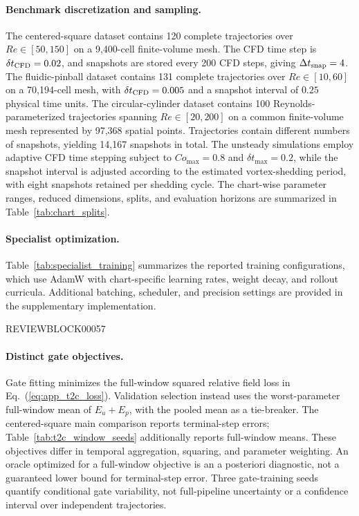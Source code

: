 \documentclass{article}
\def\plaineqref#1{\ref{#1}}
\begin{document}
\paragraph{Benchmark discretization and sampling.}
The centered-square dataset contains 120 complete trajectories over
$Re\in[50,150]$ on a 9,400-cell finite-volume mesh. The CFD time step is $\delta t_{\rm CFD}=0.02$, and snapshots are stored every 200 CFD steps, giving $\Delta t_{\rm snap}=4$. The fluidic-pinball dataset contains 131 complete trajectories over $Re\in[10,60]$ on a 70,194-cell mesh, with $\delta t_{\rm CFD}=0.005$ and a snapshot interval of $0.25$ physical time units. The circular-cylinder dataset contains 100 Reynolds-parameterized trajectories spanning
$Re\in[20,200]$ on a common finite-volume mesh represented by 97,368 spatial points. Trajectories contain different numbers of snapshots, yielding 14,167 snapshots in total. The unsteady simulations employ adaptive CFD time stepping subject to $Co_{\max}=0.8$ and $\delta t_{\max}=0.2$, while the snapshot interval is adjusted according to the estimated vortex-shedding period, with eight snapshots retained per shedding cycle. The chart-wise parameter ranges, reduced dimensions, splits, and evaluation horizons are summarized in Table~\ref{tab:chart_splits}.


\paragraph{Specialist optimization.}
Table~\ref{tab:specialist_training} summarizes the reported training configurations, which use AdamW with chart-specific learning rates, weight decay, and rollout curricula.
Additional batching, scheduler, and precision settings are provided in the supplementary implementation.

\par


REVIEWBLOCK00057


\par

\paragraph{Distinct gate objectives.}
Gate fitting minimizes the full-window squared relative field loss in Eq.~(\plaineqref{eq:app_t2c_loss}). Validation selection instead uses the worst-parameter full-window mean of $E_u+E_p$, with the pooled mean as a tie-breaker. The centered-square main comparison reports terminal-step errors; Table~\ref{tab:t2c_window_seeds} additionally reports full-window means. These objectives differ in temporal aggregation, squaring, and parameter weighting. An oracle optimized for a full-window objective is an a posteriori diagnostic, not a guaranteed lower bound for terminal-step error. Three gate-training seeds quantify conditional gate variability, not full-pipeline uncertainty or a confidence interval over independent trajectories.
\end{document}
